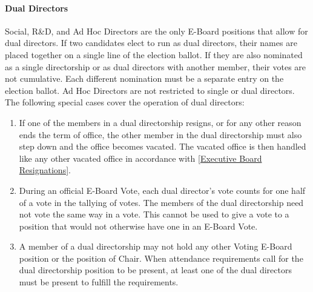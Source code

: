 \documentclass{article}
\newcommand{\asubsubsection}[1]{\paragraph{#1} \label{#1}}
\begin{document}
\asubsubsection{Dual Directors}
Social, R\&D, and Ad Hoc Directors are the only E-Board positions that allow for dual directors.
If two candidates elect to run as dual directors, their names are placed together on a single line of the election ballot.
If they are also nominated as a single directorship or as dual directors with another member, their votes are not cumulative.
Each different nomination must be a separate entry on the election ballot.
Ad Hoc Directors are not restricted to single or dual directors.
The following special cases cover the operation of dual directors:
\begin{enumerate}
	\item If one of the members in a dual directorship resigns, or for any other reason ends the term of office, the other member in the dual directorship must also step down and the office becomes vacated.
	      The vacated office is then handled like any other vacated office in accordance with \ref{Executive Board Resignations}.
	\item During an official E-Board Vote, each dual director's vote counts for one half of a vote in the tallying of votes.
	      The members of the dual directorship need not vote the same way in a vote.
	      This cannot be used to give a vote to a position that would not otherwise have one in an E-Board Vote.
	\item A member of a dual directorship may not hold any other Voting E-Board position or the position of Chair.
	      When attendance requirements call for the dual directorship position to be present, at least one of the dual directors must be present to fulfill the requirements.
\end{enumerate}
\end{document}
